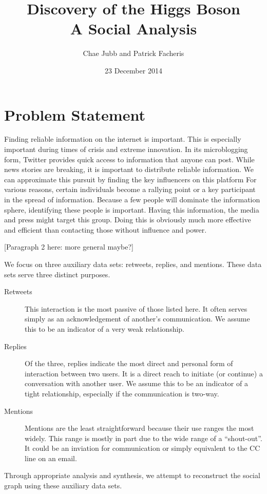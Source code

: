 \documentclass{sig-alternate-10pt}
\title{Discovery of the Higgs Boson\\ \Large A Social Analysis}
\author{
	Chae Jubb and Patrick Facheris \\
	\ttt{\{ecj2122,plf2110\}@columbia.edu}
}
\date{23 December 2014}
\begin{document}
\maketitle

\section{Problem Statement}
Finding reliable information on the internet is important.
This is especially important during times of crisis and extreme innovation.
In its microblogging form, Twitter provides quick access to information that anyone can post.
While news stories are breaking, it is important to distribute reliable information.
We can approximate this pursuit by finding the key influencers on this platform
For various reasons, certain individuals become a rallying point or a key participant in the spread of information.
Because a few people will dominate the information sphere, identifying these people is important.
Having this information, the media and press might target this group.
Doing this is obviously much more effective and efficient than contacting those without influence and power.

[Paragraph 2 here: more general maybe?]

We focus on three auxiliary data sets: retweets, replies, and mentions.
These data sets serve three distinct purposes.
\begin{description}
\item [Retweets]
    This interaction is the most passive of those listed here.
    It often serves simply as an acknowledgement of another's communication.
    We assume this to be an indicator of a very weak relationship.
\item [Replies]
    Of the three, replies indicate the most direct and personal form of interaction between two users.
    It is a direct reach to initiate (or continue) a conversation with another user.
    We assume this to be an indicator of a tight relationship, especially if the communication is two-way.
\item [Mentions]
    Mentions are the least straightforward because their use ranges the most widely.
    This range is mostly in part due to the wide range of a ``shout-out''.
    It could be an inviation for communication or simply equivalent to the CC line on an email.
\end{description}
Through appropriate analysis and synthesis, we attempt to reconstruct the social graph using these auxiliary data sets.
\end{document}
